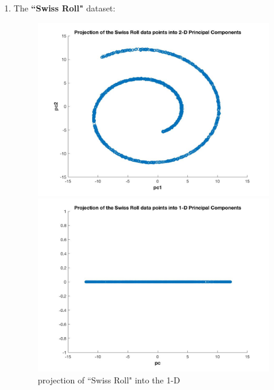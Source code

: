 \documentclass[a4paper]{article}
\begin{document}
\begin{spacing}{2.0}
	 \begin{enumerate}[-]
	 \newpage
	\item The \textbf{``Swiss Roll"} dataset:
	  \begin{figure}[H]
	    \begin{minipage}[t]{0.5\textwidth}
	        \centering
	        \includegraphics[width=4in]{1_1.jpg}
	        \caption{projection of ``Swiss Roll" into the 2-D}
	        \label{fig:side:a}
	    \end{minipage}%
	  \begin{minipage}[t]{0.5\textwidth}
	      \centering
	      \includegraphics[width=4in]{1_2.jpg}
	      \caption{projection of ``Swiss Roll" into the 1-D}
	      \label{fig:side:b}
	    \end{minipage}
	  \end{figure}
	  

\end{enumerate}
\end{spacing}
\end{document}
